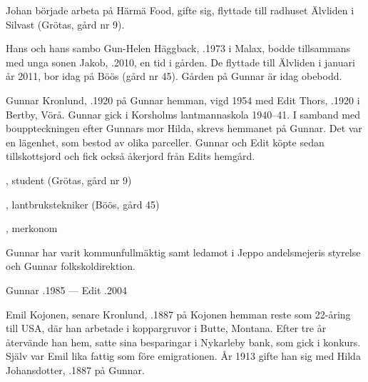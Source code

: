 Johan började arbeta på Härmä Food, gifte sig, flyttade till radhuset Älvliden i Silvast (Grötas, gård nr 9).

Hans och hans sambo Gun-Helen Häggback, .1973 i Malax, bodde tillsammans med unga sonen Jakob, .2010, en tid i gården. De flyttade till Älvliden i januari år 2011, bor idag på Böös (gård nr 45). Gården på Gunnar är idag obebodd.


%
Gunnar Kronlund, .1920 på Gunnar hemman, vigd 1954 med Edit Thors, .1920 i Bertby, Vörå. Gunnar gick i Korsholms lantmannaskola 1940--41. I samband med bouppteckningen efter Gunnars mor Hilda, skrevs hemmanet på Gunnar. Det var en lägenhet, som bestod av olika parceller. Gunnar och Edit köpte sedan tillskottsjord och fick också åkerjord från Edits hemgård.
\begin{jhchildren}
  \item {}, student (Grötas, gård nr 9)
  \item {}, lantbrukstekniker (Böös, gård 45)
  \item {}, merkonom
\end{jhchildren}

Gunnar har varit kommunfullmäktig samt ledamot i Jeppo andelsmejeris styrelse och Gunnar folkskoldirektion.

Gunnar .1985  ---  Edit .2004



%



%
Emil Kojonen, senare Kronlund, .1887 på Kojonen hemman reste som 22-åring till USA, där han arbetade i koppargruvor i Butte, Montana. Efter tre år återvände han hem, satte sina besparingar i Nykarleby bank, som gick i konkurs. Själv var Emil lika fattig som före emigrationen. År 1913 gifte han sig med Hilda Johansdotter, .1887 på Gunnar.
\begin{jhchildren}
  \item {}
  \item {}
\end{jhchildren}

